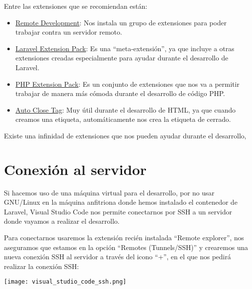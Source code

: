 Entre las extensiones que se recomiendan están:
\begin{itemize}
    \item \href{https://marketplace.visualstudio.com/items?itemName=ms-vscode-remote.vscode-remote-extensionpack}{Remote Development}: Nos instala un grupo de extensiones para poder trabajar contra un servidor remoto.

    \item \href{https://marketplace.visualstudio.com/items?itemName=onecentlin.laravel-extension-pack}{Laravel Extension Pack}: Es una “meta-extensión”, ya que incluye a otras extensiones creadas especialmente para ayudar durante el desarrollo de Laravel.

    \item \href{https://marketplace.visualstudio.com/items?itemName=xdebug.php-pack}{PHP Extension Pack}: Es un conjunto de extensiones que nos va a permitir trabajar de manera más cómoda durante el desarrollo de código PHP.

    \item \href{https://marketplace.visualstudio.com/items?itemName=formulahendry.auto-close-tag}{Auto Close Tag}: Muy útil durante el desarrollo de HTML, ya que cuando creamos una etiqueta, automáticamente nos crea la etiqueta de cerrado.
\end{itemize}

Existe una infinidad de extensiones que nos pueden ayudar durante el desarrollo,

\section{Conexión al servidor}
Si hacemos uso de una máquina virtual para el desarrollo, por no usar GNU/Linux en la máquina anfitriona donde hemos instalado el contenedor de Laravel, Visual Studio Code nos permite conectarnos por SSH a un servidor donde vayamos a realizar el desarrollo.

Para conectarnos usaremos la extensión recién instalada “Remote explorer”, nos aseguramos que estamos en la opción “Remotes (Tunnels/SSH)” y crearemos una nueva conexión SSH al servidor a través del icono “+”, en el que nos pedirá realizar la conexión SSH:

\begin{center}
    \texttt{[image: visual\_studio\_code\_ssh.png]}
\end{center}


